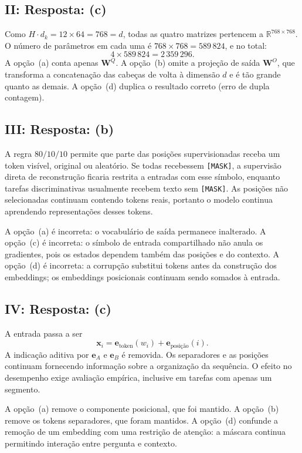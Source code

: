 \documentclass{dlproblemset}
\begin{document}
\subsection*{II: Resposta: (c)}
Como $H \cdot d_k = 12 \times 64 = 768 = d$, todas as quatro matrizes pertencem a
$\mathbb{R}^{768 \times 768}$. O número de parâmetros em cada uma é
$768 \times 768 = 589\,824$, e no total:
\[
  4 \times 589\,824 = 2\,359\,296.
\]
A opção~(a) conta apenas $\mathbf{W}^Q$.
A opção~(b) omite a projeção de saída $\mathbf{W}^O$, que transforma a concatenação das
cabeças de volta à dimensão $d$ e é tão grande quanto as demais.
A opção~(d) duplica o resultado correto (erro de dupla contagem).

\subsection*{III: Resposta: (b)}
A regra $80/10/10$ permite que parte das posições supervisionadas receba
um token visível, original ou aleatório. Se todas recebessem \texttt{[MASK]},
a supervisão direta de reconstrução ficaria restrita a entradas com esse símbolo,
enquanto tarefas discriminativas usualmente recebem texto sem \texttt{[MASK]}.
As posições não selecionadas continuam contendo tokens reais, portanto o modelo
continua aprendendo representações desses tokens.

A opção~(a) é incorreta: o vocabulário de saída permanece inalterado.
A opção~(c) é incorreta: o símbolo de entrada compartilhado não anula os
gradientes, pois os estados dependem também das posições e do contexto.
A opção~(d) é incorreta: a corrupção substitui tokens antes da construção
dos embeddings; os embeddings posicionais continuam sendo somados à entrada.

\subsection*{IV: Resposta: (c)}
A entrada passa a ser
\[
  \mathbf x_i=\mathbf e_{\text{token}}(w_i)+\mathbf e_{\text{posição}}(i).
\]
A indicação aditiva por $\mathbf e_A$ e $\mathbf e_B$ é removida.
Os separadores e as posições continuam fornecendo informação sobre a
organização da sequência. O efeito no desempenho exige avaliação empírica,
inclusive em tarefas com apenas um segmento.

A opção~(a) remove o componente posicional, que foi mantido.
A opção~(b) remove os tokens separadores, que foram mantidos.
A opção~(d) confunde a remoção de um embedding com uma restrição de atenção:
a máscara continua permitindo interação entre pergunta e contexto.
\end{document}
